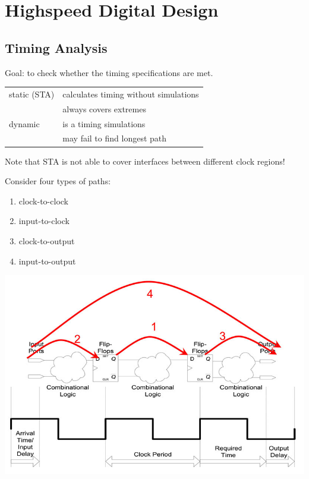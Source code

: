 \section{Highspeed Digital Design}

\subsection{Timing Analysis}
Goal: to check whether the timing specifications are met.

\begin{table}[htbp]
    \centering
    \begin{tabularx}{0.8\linewidth}{lX}
        static (STA) & calculates timing without simulations \\
            & always covers extremes \\
         dynamic & is a timing simulations \\
             & may fail to find longest path \\
    \end{tabularx}
\end{table}

Note that STA is not able to cover interfaces between different clock regions!

\begin{multicols}{2}
    Consider four types of paths:
    \begin{enumerate}
        \item clock-to-clock 
        \item input-to-clock
        \item clock-to-output
        \item input-to-output
    \end{enumerate}
    \vfill
    \columnbreak
    \includegraphics[width=0.8\linewidth]{images/HSDigital_TimingAnalysis.jpg}
\end{multicols}

